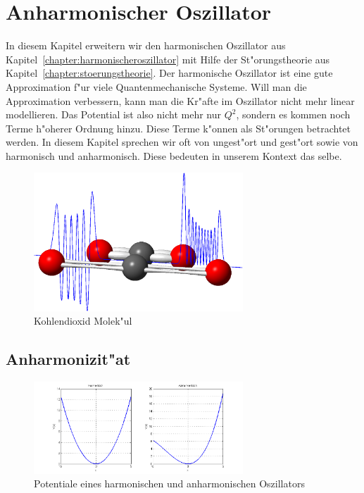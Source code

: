 \chapter{Anharmonischer Oszillator\label{chapter:anharmonisch}}
\begin{refsection}

In diesem Kapitel erweitern wir den harmonischen Oszillator aus Kapitel~\ref{chapter:harmonischeroszillator} mit Hilfe der St"orungstheorie aus Kapitel~\ref{chapter:stoerungstheorie}. Der harmonische Oszillator ist eine gute Approximation f"ur viele Quantenmechanische Systeme. Will man die Approximation verbessern, kann man die Kr"afte im Oszillator nicht mehr linear modellieren. Das Potential ist also nicht mehr nur $Q^2$, sondern es kommen noch Terme h"oherer Ordnung hinzu. Diese Terme k"onnen als St"orungen betrachtet werden. In diesem Kapitel sprechen wir oft von ungest"ort und gest"ort sowie von harmonisch und anharmonisch. Diese bedeuten in unserem Kontext das selbe.

\begin{figure}	%
\centering
\includegraphics[width=0.7\textwidth]{anharmonisch/images/Titelbild.png}
\caption{Kohlendioxid Molek"ul
\label{skript:Titelbild}}
\end{figure}

\section{Anharmonizit"at}

\begin{figure}	%
\centering
\includegraphics[width=0.7\textwidth]{anharmonisch/images/Potential.png}
\caption{Potentiale eines harmonischen und anharmonischen Oszillators
\label{skript:Potentiale}}
\end{figure}


\end{refsection}
